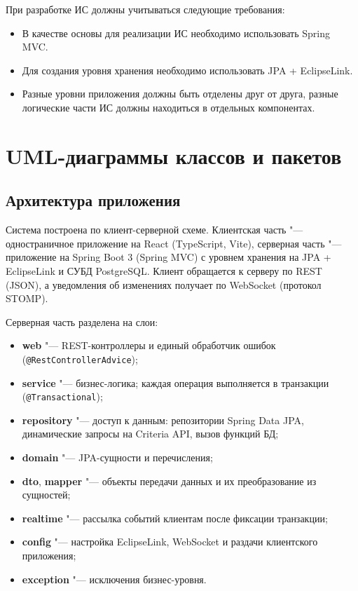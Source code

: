 \documentclass[a4paper,12pt]{article}
\begin{document}
При разработке ИС должны учитываться следующие требования:
\begin{itemize}
  \item В качестве основы для реализации ИС необходимо использовать Spring MVC.
  \item Для создания уровня хранения необходимо использовать JPA + EclipseLink.
  \item Разные уровни приложения должны быть отделены друг от друга, разные логические части ИС должны находиться в отдельных компонентах.
\end{itemize}

\newpage
\section{UML-диаграммы классов и пакетов}

\subsection{Архитектура приложения}

Система построена по клиент-серверной схеме. Клиентская часть "--- одностраничное приложение на React (TypeScript, Vite), серверная часть "--- приложение на Spring Boot 3 (Spring MVC) с уровнем хранения на JPA + EclipseLink и СУБД PostgreSQL. Клиент обращается к серверу по REST (JSON), а уведомления об изменениях получает по WebSocket (протокол STOMP).

Серверная часть разделена на слои:
\begin{itemize}
  \item \textbf{web} "--- REST-контроллеры и единый обработчик ошибок (\texttt{@RestControllerAdvice});
  \item \textbf{service} "--- бизнес-логика; каждая операция выполняется в транзакции (\texttt{@Transactional});
  \item \textbf{repository} "--- доступ к данным: репозитории Spring Data JPA, динамические запросы на Criteria API, вызов функций БД;
  \item \textbf{domain} "--- JPA-сущности и перечисления;
  \item \textbf{dto}, \textbf{mapper} "--- объекты передачи данных и их преобразование из сущностей;
  \item \textbf{realtime} "--- рассылка событий клиентам после фиксации транзакции;
  \item \textbf{config} "--- настройка EclipseLink, WebSocket и раздачи клиентского приложения;
  \item \textbf{exception} "--- исключения бизнес-уровня.
\end{itemize}
\end{document}
